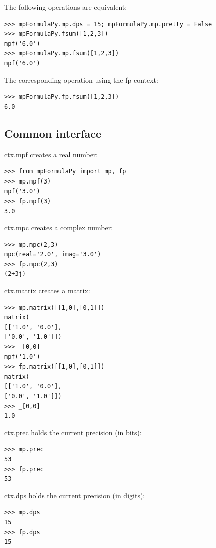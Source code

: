 The following operations are equivalent:

\begin{lstlisting}
>>> mpFormulaPy.mp.dps = 15; mpFormulaPy.mp.pretty = False
>>> mpFormulaPy.fsum([1,2,3])
mpf('6.0')
>>> mpFormulaPy.mp.fsum([1,2,3])
mpf('6.0')
\end{lstlisting}


The corresponding operation using the fp context:

\begin{lstlisting}
>>> mpFormulaPy.fp.fsum([1,2,3])
6.0
\end{lstlisting}


\subsection{Common interface}  

ctx.mpf creates a real number:

\begin{lstlisting}
>>> from mpFormulaPy import mp, fp
>>> mp.mpf(3)
mpf('3.0')
>>> fp.mpf(3)
3.0
\end{lstlisting}


ctx.mpc creates a complex number:

\begin{lstlisting}
>>> mp.mpc(2,3)
mpc(real='2.0', imag='3.0')
>>> fp.mpc(2,3)
(2+3j)
\end{lstlisting}


ctx.matrix creates a matrix:

\begin{lstlisting}
>>> mp.matrix([[1,0],[0,1]])
matrix(
[['1.0', '0.0'],
['0.0', '1.0']])
>>> _[0,0]
mpf('1.0')
>>> fp.matrix([[1,0],[0,1]])
matrix(
[['1.0', '0.0'],
['0.0', '1.0']])
>>> _[0,0]
1.0
\end{lstlisting}


ctx.prec holds the current precision (in bits):

\begin{lstlisting}
>>> mp.prec
53
>>> fp.prec
53
\end{lstlisting}


ctx.dps holds the current precision (in digits):

\begin{lstlisting}
>>> mp.dps
15
>>> fp.dps
15
\end{lstlisting}



